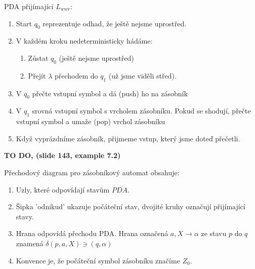 \documentclass[../main.tex]{subfiles}
\begin{document}
    \begin{example}[Zásobníkový automat pro jazyk: $L_{wwr} = {ww^R : w \in (0+1)^*}$]
        PDA přijímající $L_{wwr}$:
        \begin{enumerate}
            \item Start $q_0$ reprezentuje odhad, že ještě nejsme uprostřed.
            \item V každém kroku nedeterministicky hádáme:
            \begin{enumerate}
                \item Zůstat $q_0$ (ještě nejsme uprostřed)
                \item Přejít $\lambda$ přechodem do $q_1$ (už jsme viděli střed).
            \end{enumerate}
            \item V $q_0$ přečte vstupní symbol a dá (push) ho na zásobník
            \item V $q_1$ srovná vstupní symbol s vrcholem zásobníku. Pokud se shodují,
            přečte vstupní symbol a umaže (pop) vrchol zásobníku
            \item Když vyprázdníme zásobník, přijmeme vstup, který jsme doteď přečetli.
        \end{enumerate}
    \end{example}

    \begin{example}
        \textbf{TO DO, (slide 143, example 7.2)}
    \end{example}

    \begin{definition}
        Přechodový diagram pro zásobníkový automat obsahuje:
        \begin{enumerate}
            \item Uzly, které odpovídají stavům $PDA$.
            \item Šipka 'odnikud' ukazuje počáteční stav, dvojité kruhy označují přijímající stavy.
            \item Hrana odpovídá přechodu PDA. Hrana označená $a, X \rightarrow \alpha$ ze stavu
            $p$ do $q$ znamená $\delta(p,a,X) \ni (q,\alpha)$
            \item Konvence je, že počáteční symbol zásobníku značíme $Z_0$.
        \end{enumerate}
    \end{definition}
\end{document}
